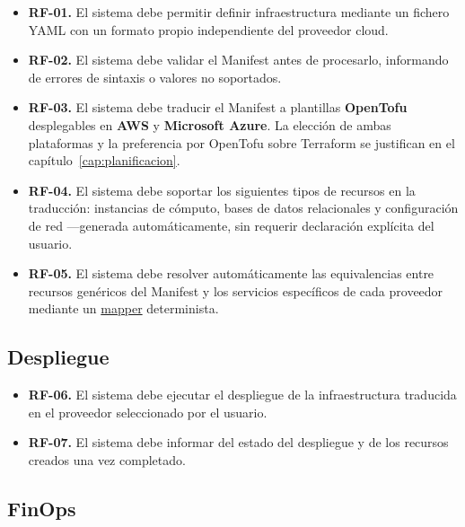 \begin{itemize}
    \item \textbf{RF-01.} El sistema debe permitir definir infraestructura mediante
    un fichero YAML con un formato propio independiente del proveedor cloud.

    \item \textbf{RF-02.} El sistema debe validar el Manifest antes de procesarlo,
    informando de errores de sintaxis o valores no soportados.

    \item \textbf{RF-03.} El sistema debe traducir el Manifest a plantillas
    \textbf{OpenTofu} desplegables en \textbf{AWS} y \textbf{Microsoft Azure}.
    La elección de ambas plataformas y la preferencia por OpenTofu sobre
    Terraform se justifican en el capítulo~\ref{cap:planificacion}.

    \item \textbf{RF-04.} El sistema debe soportar los siguientes tipos de
    recursos en la traducción: instancias de cómputo, bases de datos relacionales
    y configuración de red —generada automáticamente, sin requerir declaración
    explícita del usuario.

    \item \textbf{RF-05.} El sistema debe resolver automáticamente las equivalencias
    entre recursos genéricos del Manifest y los servicios específicos de cada
    proveedor mediante un \hyperlink{mapper}{mapper} determinista.
\end{itemize}

\subsection{Despliegue}

\begin{itemize}
    \item \textbf{RF-06.} El sistema debe ejecutar el despliegue de la
    infraestructura traducida en el proveedor seleccionado por el usuario.

    \item \textbf{RF-07.} El sistema debe informar del estado del despliegue
    y de los recursos creados una vez completado.
\end{itemize}

\subsection{FinOps}

